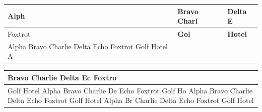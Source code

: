 \documentclass[11pt,a4paper]{article}
\begin{document}
\begin{table}[h]
\begin{tabular}{|l|l|l|}
\hline
Alph & Bravo Charl & Delta E \\ \hline
Foxtrot  & \textbf{Gol} & \textbf{Hotel} \\ \hline
Alpha Bravo  Charlie Delta Echo Foxtrot Golf Hotel A &  &  \\ \hline
\end{tabular}
\end{table}

\begin{table}[h]
\begin{tabular}{|l|}
\hline
Bravo Charlie Delta Ec  Foxtro \\ \hline
Golf Hotel Alpha Bravo Charlie De  Echo Foxtrot Golf Ho  Alpha Bravo Charlie Delta Echo Foxtrot  Golf Hotel Alpha Br  Charlie Delta Echo Foxtrot Golf Hotel \\ \hline
\end{tabular}
\end{table}
\end{document}
